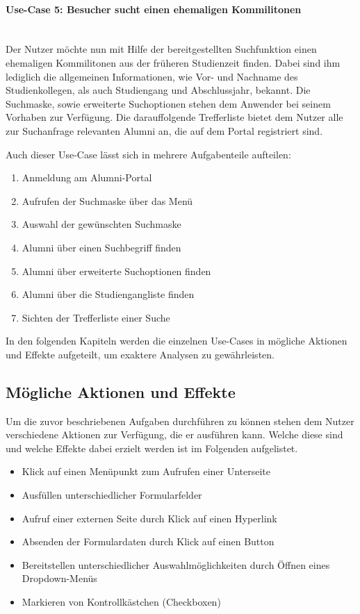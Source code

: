 \paragraph{Use-Case 5: Besucher sucht einen ehemaligen Kommilitonen}\quad \\
Der Nutzer möchte nun mit Hilfe der bereitgestellten Suchfunktion einen ehemaligen Kommilitonen aus der früheren Studienzeit finden. Dabei sind ihm lediglich die allgemeinen Informationen, wie Vor- und Nachname des Studienkollegen, als auch Studiengang und Abschlussjahr, bekannt. 
Die Suchmaske, sowie erweiterte Suchoptionen stehen dem Anwender bei seinem Vorhaben zur Verfügung. Die darauffolgende Trefferliste bietet dem Nutzer alle zur Suchanfrage relevanten Alumni an, die auf dem Portal registriert sind.

Auch dieser Use-Case lässt sich in mehrere Aufgabenteile aufteilen:
\begin{enumerate}
	\item Anmeldung am Alumni-Portal
	\item Aufrufen der Suchmaske über das Menü
	\item Auswahl der gewünschten Suchmaske
	\item Alumni über einen Suchbegriff finden
	\item Alumni über erweiterte Suchoptionen finden
	\item Alumni über die Studiengangliste finden
	\item Sichten der Trefferliste einer Suche
\end{enumerate}



In den folgenden Kapiteln werden die einzelnen Use-Cases in mögliche Aktionen und Effekte aufgeteilt, um exaktere Analysen zu gewährleisten.

\subsection{Mögliche Aktionen und Effekte}
Um die zuvor beschriebenen Aufgaben durchführen zu können stehen dem Nutzer verschiedene Aktionen zur Verfügung, die er ausführen kann. Welche diese sind und welche Effekte dabei erzielt werden ist im Folgenden aufgelistet.

\begin{itemize}
\item Klick auf einen Menüpunkt zum Aufrufen einer Unterseite
\item Ausfüllen unterschiedlicher Formularfelder
\item Aufruf einer externen Seite durch Klick auf einen Hyperlink
\item Absenden der Formulardaten durch Klick auf einen Button
\item Bereitstellen unterschiedlicher Auswahlmöglichkeiten durch Öffnen eines Dropdown-Menüs
\item Markieren von Kontrollkästchen (Checkboxen)
\end{itemize}